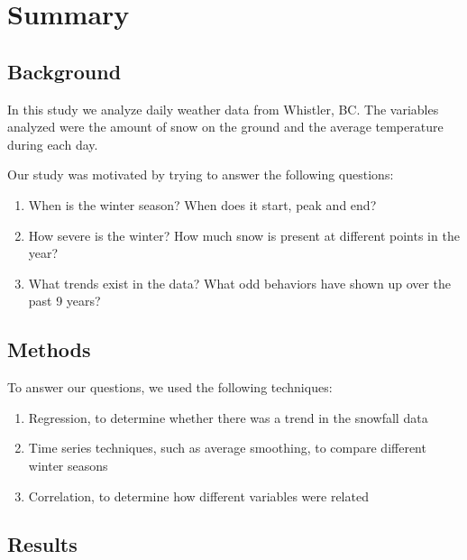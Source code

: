 \documentclass[12pt,twoside]{article}
\begin{document}




%
{%

\section{Summary}

\subsection{Background}

In this study we analyze daily weather data from Whistler, BC. The variables analyzed were the amount of snow on the ground and the average temperature during each day.

\medskip\noindent
Our study was motivated by trying to answer the following questions:

\begin{enumerate}
\item When is the winter season? When does it start, peak and end?
\item How severe is the winter? How much snow is present at different points in the year? 
\item What trends exist in the data? What odd behaviors have shown up over the past 9 years? 
\end{enumerate}

\subsection{Methods}

\noindent
To answer our questions, we used the following techniques:

\begin{enumerate}
\item Regression, to determine whether there was a trend in the snowfall data
\item Time series techniques, such as average smoothing, to compare different winter seasons
\item Correlation, to determine how different variables were related
\end{enumerate}

\subsection{Results}

}
\end{document}
